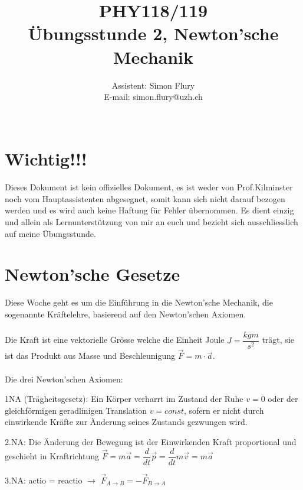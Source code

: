 \documentclass[12pt]{article}
\begin{document}
\title{PHY118/119 \\ {\bf Übungsstunde 2, Newton'sche Mechanik}}
\author{Assistent: Simon Flury \\E-mail: simon.flury@uzh.ch\\\\ }
\maketitle

\section{Wichtig!!!}
Dieses Dokument ist kein offizielles Dokument, es ist weder von Prof.Kilminster noch vom Hauptassistenten abgesegnet, somit kann sich nicht darauf bezogen werden und es wird auch keine Haftung für Fehler übernommen. Es dient einzig und allein als Lernunterstützung von mir an euch und bezieht sich ausschliesslich auf meine Übungsstunde.
\section{Newton'sche Gesetze}
Diese Woche geht es um die Einführung in die Newton'sche Mechanik, die sogenannte Kräftelehre, basierend auf den Newton'schen Axiomen.\\
\\Die Kraft ist eine vektorielle Grösse welche die Einheit Joule $J = \dfrac{kgm}{s^2}$ trägt, sie ist das Produkt aus Masse und Beschleunigung $\vec{F} = m \cdot \vec{a}$.\\
\\Die drei Newton'schen Axiomen:

\begin{itemize}
1NA (Trägheitsgesetz): Ein Körper verharrt im Zustand der Ruhe $v=0$ oder der gleichförmigen geradlinigen Translation $v=const$, sofern er nicht durch einwirkende Kräfte zur Änderung seines Zustands gezwungen wird.
\end{itemize}

\begin{itemize}
2.NA: Die Änderung der Bewegung ist der Einwirkenden Kraft proportional und geschieht in Kraftrichtung $\vec{F} = m\vec{a} = \dfrac{d}{dt} \vec{p} = \dfrac{d}{dt} m\vec{v} = m \vec{a}$
\end{itemize}
\begin{itemize}
3.NA: actio = reactio $\rightarrow$ $\vec{F}_{A\rightarrow B} = -\vec{F}_{B\rightarrow A}$
\end{itemize}
\end{document}
